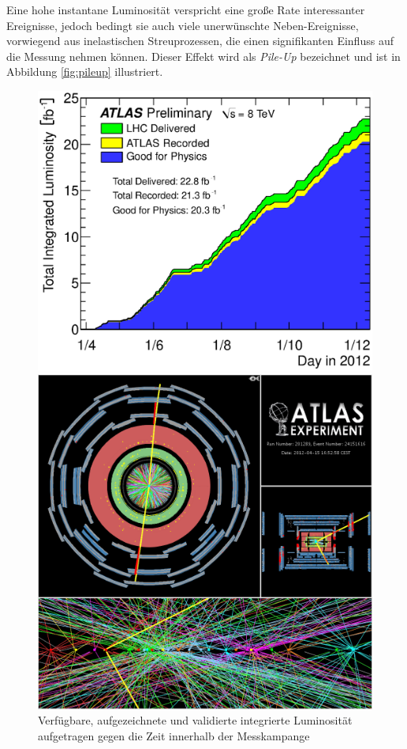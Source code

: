 Eine hohe instantane Luminosität verspricht eine große Rate interessanter
Ereignisse, jedoch bedingt sie auch viele unerwünschte Neben-Ereignisse,
vorwiegend aus inelastischen Streuprozessen, die einen signifikanten Einfluss
auf die Messung nehmen können. Dieser Effekt wird als \textit{Pile-Up}
bezeichnet und ist in Abbildung \ref{fig:pileup} illustriert.

\begin{figure}
    \begin{minipage}[b]{0.48\textwidth}
        \centering
        \includegraphics[width=1.\textwidth]{plots/lumi}
        \captionsetup{format=plain}
        \caption{Verfügbare, aufgezeichnete und validierte integrierte
            Luminosität aufgetragen gegen die Zeit innerhalb der Messkampange}
        \label{fig:lumi}
    \end{minipage}
    \hfill
    \begin{minipage}[b]{0.48\textwidth}
        \centering
        \includegraphics[width=1.\textwidth]{img/pileup}

\end{minipage}
\end{figure}

